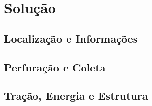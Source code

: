 \chapter{Solução}
  \section{Localização e Informações}

  \section{Perfuração e Coleta}

  \section{Tração, Energia e Estrutura}
